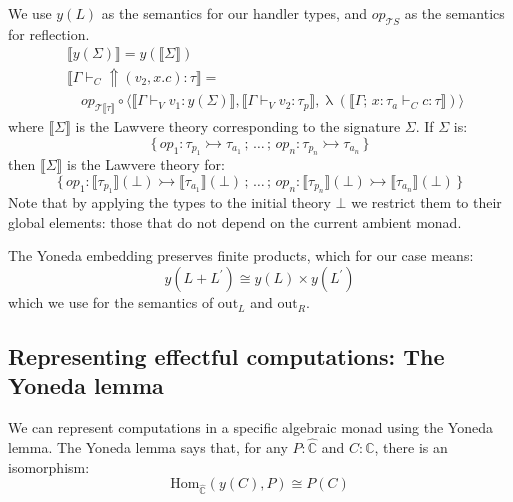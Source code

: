 \documentclass[acmsmall, screen, review, anonymous]{acmart}
\theoremstyle{definition}
\newcommand{\cat}{\mathbb{C}}
\newcommand{\catobj}{C}
\newcommand{\psh}{\widehat{\cat}}
\newcommand{\initial}{\bot}
\newcommand{\yoneda}[1]{y(#1)}
\newcommand{\homset}[3]{\mathrm{Hom}_{#1}(#2, #3)}
\newcommand{\sem}[1]{\llbracket #1 \rrbracket}
\newcommand{\reflectname}{\Uparrow}
\newcommand{\performraw}[2]{\mathop{\reflectname(#1(#2))}}
\newcommand{\perform}[5]{\performraw{#1}{#2}(#3, #4. #5)}
\newcommand{\outlname}{\mathrm{out}_L}
\newcommand{\outrname}{\mathrm{out}_R}
\newcommand{\mon}{\mathcal{T}}
\newcommand{\seq}{\,;\,}
\newcommand{\types}{\mathrel{:}}
\newcommand{\ccons}[2]{#1;\,#2}
\newcommand{\lbind}[3]{\ccons{#1}{#2\types#3}}
\newcommand{\turnv}{\mathrel{\vdash_V}}
\newcommand{\turnc}{\mathrel{\vdash_C}}
\newcommand{\currymap}{\mathop{\lambda}}
\begin{document}
We use $\yoneda{L}$ as the semantics for our handler types, and
$op_{\mon{S}}$ as the semantics for reflection.
\begin{align*}
&\sem{\yoneda{\Sigma}} = \yoneda{\sem{\Sigma}} \\
&\sem{\Gamma \turnc \perform{v_1}{op}{v_2}{x}{c} \types \tau} = \\
&\quad op_{\mon{\sem{\tau}}}
       \circ \langle \sem{\Gamma \turnv v_1 \types \yoneda{\Sigma}},
                      \sem{\Gamma \turnv v_2 \types \tau_p},
                      \currymap(\sem{\lbind{\Gamma}{x}{\tau_a} \turnc c \types \tau})
             \rangle
\end{align*}
where $\sem{\Sigma}$ is the Lawvere theory corresponding to the
signature $\Sigma$. If $\Sigma$ is:
\begin{equation*}
  \{ \, op_1 \types \tau_{p_1} \rightarrowtail \tau_{a_1} \seq
  \ldots \seq
  op_n \types \tau_{p_n} \rightarrowtail \tau_{a_n} \, \}
\end{equation*}
then $\sem{\Sigma}$ is the Lawvere theory for:
\begin{equation*}
  \{ \, op_1 \types \sem{\tau_{p_1}}(\initial)
                    \rightarrowtail \sem{\tau_{a_1}}(\initial) \seq
  \ldots \seq
  op_n \types \sem{\tau_{p_n}}(\initial)
              \rightarrowtail \sem{\tau_{a_n}}(\initial) \, \}
\end{equation*}
Note that by applying the types to the initial theory $\initial$ we
restrict them to their global elements: those that do not depend on the
current ambient monad.

The Yoneda embedding preserves finite products, which for our case
means:
\begin{equation*}
\yoneda{L + L^{\prime}} \cong \yoneda{L} \times \yoneda{L^{\prime}}
\end{equation*}
which we use for the semantics of $\outlname$ and $\outrname$.

\subsection{Representing effectful computations: The Yoneda lemma}

We can represent computations in a specific algebraic monad using the
Yoneda lemma. The Yoneda lemma says that, for any $P \types \psh$ and
$\catobj \types \cat$, there is an isomorphism:
\begin{equation*}
  \homset{\psh}{\yoneda{\catobj}}{P} \cong P(\catobj)
\end{equation*}
\end{document}
